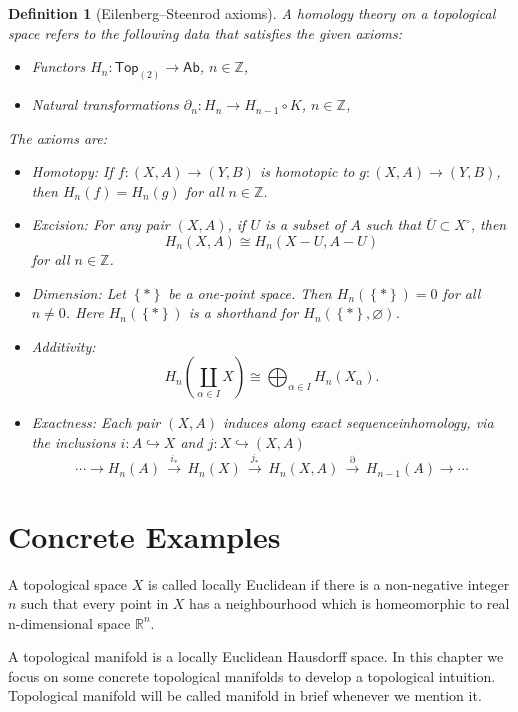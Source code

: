 \documentclass{report}
\newtheorem{definition}{Definition}[section]
\theoremstyle{nonumberplain}
\begin{document}
\begin{definition}[Eilenberg–Steenrod axioms]
	A homology theory on a topological space refers to the following data that satisfies the given axioms:
	\begin{itemize}
		\item Functors $H_n:\mathsf{Top}_{(2)}\to \mathsf{Ab}$, $n\in\mathbb{Z}$,
		\item Natural transformations $\partial_n:H_n\to H_{n-1}\circ K$, $n\in\mathbb{Z}$,
	\end{itemize}
	The axioms are:
	\begin{itemize}
		\item Homotopy: If $f:(X, A)\to (Y, B)$ is homotopic to $g:(X, A)\to (Y, B)$, then $H_n(f)=H_n(g)$ for all $n\in\mathbb{Z}$.
		\item Excision: For any pair $(X, A)$, if $U$ is a subset of $A$ such that $\overline{U}\subset X^\circ$, then $$H_n(X,A)\cong H_n(X-U,A-U)$$
		for all $n\in\mathbb{Z}$.
		\item Dimension: Let $\left\{*\right\}$ be a one-point space. Then $H_n(\left\{*\right\}) = 0$ for all $n \neq 0$. Here $H_n(\left\{*\right\})$ is a shorthand for $H_n(\left\{*\right\}, \varnothing)$.
		\item Additivity:
		\[
H_n\left(\coprod_{\alpha\in I} X\right)\cong\bigoplus_{\alpha\in I} H_n\left(X_\alpha\right).
			\]
		\item Exactness: Each pair $(X,A)$ induces along exact sequenceinhomology, via the inclusions $i: A\hookrightarrow X$ and $j:X\hookrightarrow (X, A)$ 
		$$
		\cdots \to H_n(A) \,\xrightarrow{i_*}\, H_n(X) \,\xrightarrow{j_*}\, H_n (X,A) \,\xrightarrow{\partial}\, H_{n-1}(A) \to \cdots
		$$
	\end{itemize}
\end{definition}



\chapter{Concrete Examples}
A topological space $X$ is called locally Euclidean if there is a non-negative integer $n$ such that every point in $X$ has a neighbourhood which is homeomorphic to real n-dimensional space $\mathbb{R}^n$.

\indent A topological manifold is a locally Euclidean Hausdorff space. In this chapter we focus on some concrete topological manifolds to develop a topological intuition. Topological manifold will be called manifold in brief whenever we mention it.
\end{document}
